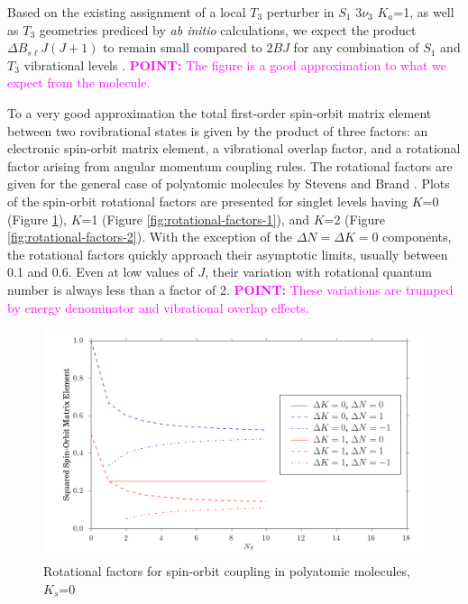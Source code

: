 \documentclass[12pt,draft]{mitthesis}
\newcommand{\POINT}[1]{\textcolor{magenta}{\textbf{POINT:} #1}}
\begin{document}
Based on the existing assignment of a local $T_3$ perturber in $S_1$
$3 \nu_3$ $K_a$=1, as well as $T_3$ geometries prediced by \emph{ab
  initio} calculations, we expect the product $\Delta B_{s\ell}J(J+1)$
to remain small compared to $2BJ$ for any combination of $S_1$ and
$T_3$ vibrational levels \cite{mishra04, ventura03, thom07}.
\POINT{The figure is a good approximation to what we expect from the
  molecule.}

To a very good approximation the total first-order spin-orbit matrix
element between two rovibrational states is given by the product of
three factors: an electronic spin-orbit matrix element, a vibrational
overlap factor, and a rotational factor arising from angular momentum
coupling rules.  The rotational factors are given for the general case
of polyatomic molecules by Stevens and Brand \cite{stevens73}.  Plots
of the spin-orbit rotational factors are presented for singlet levels
having $K$=0 (Figure \ref{fig:rotational-factors-0}), $K$=1 (Figure
\ref{fig:rotational-factors-1}), and $K$=2 (Figure
\ref{fig:rotational-factors-2}).  With the exception of the $\Delta N
= \Delta K = 0$ components, the rotational factors quickly approach
their asymptotic limits, usually between 0.1 and 0.6.  Even at low
values of $J$, their variation with rotational quantum number is
always less than a factor of 2.  \POINT{These variations are trumped
  by energy denominator and vibrational overlap effects.}

\begin{figure}
  \caption{Rotational factors for spin-orbit coupling in polyatomic
    molecules, $K_s$=0}
  \label{fig:rotational-factors-0}
  \centering
  \includegraphics[width=6in]{rotational_factors_k0.png}
\end{figure}
\end{document}
